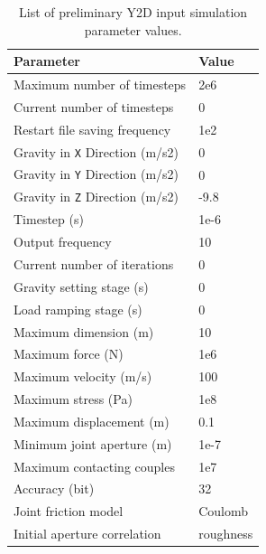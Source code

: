 \documentclass[12pt,twoside]{article}
\theoremstyle{break}
\begin{document}
\begin{table}[!htbp]
  \begin{tabular}{ll}
    Parameter                               & Value                             \\\midrule  
    Maximum number of timesteps             & 2e6                               \\
    Current number of timesteps             & 0                                 \\
    Restart file saving frequency           & 1e2                               \\
    Gravity in \texttt{X} Direction (m/s2)  & 0                                 \\
    Gravity in \texttt{Y} Direction (m/s2)  & 0                                 \\
    Gravity in \texttt{Z} Direction (m/s2)  & -9.8                              \\
    Timestep (s)                            & 1e-6                              \\
    Output frequency                        & 10                                \\
    Current number of iterations            & 0                                 \\
    Gravity setting stage (s)               & 0                                 \\
    Load ramping stage (s)                  & 0                                 \\
    Maximum dimension (m)                   & 10                                \\
    Maximum force (N)                       & 1e6                               \\
    Maximum velocity (m/s)                  & 100                               \\
    Maximum stress (Pa)                     & 1e8                               \\
    Maximum displacement (m)                & 0.1                               \\
    Minimum joint aperture (m)              & 1e-7                              \\
    Maximum contacting couples              & 1e7                               \\
    Accuracy (bit)                          & 32                                \\
    Joint friction model                    & Coulomb                           \\
    Initial aperture correlation            & roughness                         \\\bottomrule
  \end{tabular}
  \caption{List of preliminary Y2D input simulation parameter values.}
  \label{tab:simpar}
\end{table}
\end{document}
